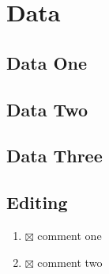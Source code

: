 \section{Data}

\subsection{Data One}


\subsection{Data Two}


\subsection{Data Three}


\subsection{Editing}
\begin{enumerate}
  \item $\boxtimes$ comment one
  \item $\boxtimes$ comment two
\end{enumerate}
